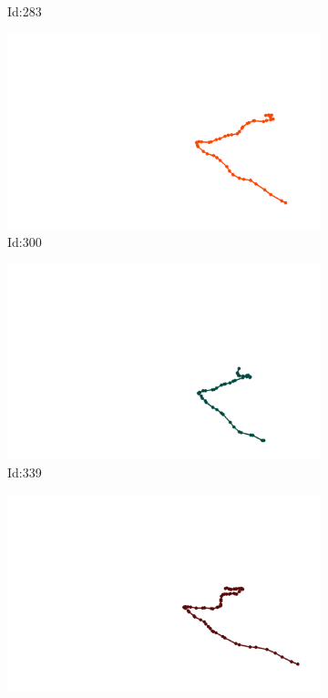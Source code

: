 \documentclass[12pt,twoside]{report}
\begin{document}
\begin{figure}
\begin{subfigure}[b]{0.20\textwidth}
\caption{Id:283}
\end{subfigure}
\begin{subfigure}[b]{0.20\textwidth}
\centering
\includegraphics[width=\textwidth]{../trajectories/300.png}
\caption{Id:300}
\end{subfigure}
\begin{subfigure}[b]{0.20\textwidth}
\centering
\includegraphics[width=\textwidth]{../trajectories/339.png}
\caption{Id:339}
\end{subfigure}
\begin{subfigure}[b]{0.20\textwidth}
\centering
\includegraphics[width=\textwidth]{../trajectories/397.png}

\end{subfigure}
\end{figure}
\end{document}
